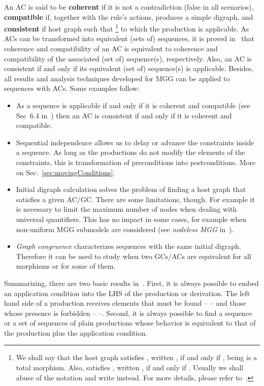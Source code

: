 \documentclass{fundam}
\begin{document}
An AC is said to be \textbf{coherent} if it is not a contradiction
(false in all scenarios), \textbf{compatible} if, together with the
rule's actions, produces a simple digraph, and \textbf{consistent} if
 host graph such that \footnote{We shall say
  that the host graph  satisfies , written , if and only if , being  is a
  total morphism. Also,  satisfies
  , written\phantom{i} , if and
  only if . Usually we shall abuse of the notation and write  instead. For more details, please refer
  to~\cite{MGGfundamenta}.} to which the production is applicable. As
ACs can be transformed into equivalent (sets of) sequences, it is
proved in~\cite{MGGfundamenta} that coherence and compatibility of an
AC is equivalent to coherence and compatibility of the associated (set
of) sequence(s), respectively. Also, an AC is consistent if and only
if its equivalent (set of) sequence(s) is applicable. Besides, all
results and analysis techniques developed for MGG can be applied to
sequences with ACs. Some examples follow:
\begin{itemize}
\item As a sequence is applicable if and only if it is coherent and
  compatible (see Sec~6.4 in~\cite{MGGBook}) then an AC is consistent
  if and only if it is coherent and compatible.
\item Sequential independence allows us to delay or advance the
  constraints inside a sequence. As long as the productions do not
  modify the elements of the constraints, this is transformation of
  preconditions into postconditions. More on
  Sec.~\ref{sec:movingConditions}.
\item Initial digraph calculation solves the problem of finding a host
  graph that satisfies a given AC/GC. There are some limitations,
  though. For example it is necessary to limit the maximum number of
  nodes when dealing with universal quantifiers. This has no impact in
  some cases, for example when non-uniform MGG submodels are
  considered (see \emph{nodeless MGG} in~\cite{MGGmodel}).
\item \emph{Graph congruence} characterizes sequences with the same
  initial digraph. Therefore it can be used to study when two
  GCs/ACs are equivalent for all morphisms or for some of them.
\end{itemize}

Summarizing, there are two basic results
in~\cite{MGGfundamenta}. First, it is always possible to embed an
application condition into the LHS of the production or
derivation. The left hand side  of a production receives elements
that must be found --  -- and  those whose presence is
forbidden --  --. Second, it is always possible to
find a sequence or a set of sequences of plain productions whose
behavior is equivalent to that of the production plus the application
condition.
\end{document}
